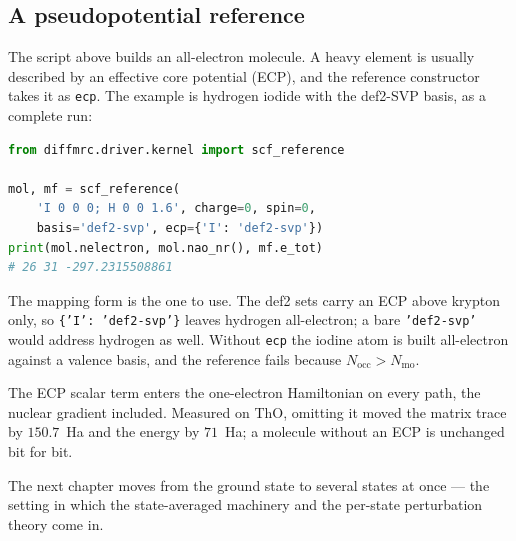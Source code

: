 \subsection{A pseudopotential reference}

The script above builds an all-electron molecule.  A heavy element is
usually described by an effective core potential (ECP), and the
reference constructor takes it as \texttt{ecp}.  The example is
hydrogen iodide with the def2-SVP basis, as a complete run:

\begin{lstlisting}[language=Python]
from diffmrc.driver.kernel import scf_reference

mol, mf = scf_reference(
    'I 0 0 0; H 0 0 1.6', charge=0, spin=0,
    basis='def2-svp', ecp={'I': 'def2-svp'})
print(mol.nelectron, mol.nao_nr(), mf.e_tot)
# 26 31 -297.2315508861
\end{lstlisting}

The mapping form is the one to use.  The def2 sets carry an ECP above
krypton only, so \texttt{\{'I': 'def2-svp'\}} leaves hydrogen
all-electron; a bare \texttt{'def2-svp'} would address hydrogen as
well.  Without \texttt{ecp} the iodine atom is built all-electron
against a valence basis, and the reference fails because
$N_{\mathrm{occ}} > N_{\mathrm{mo}}$.

The ECP scalar term enters the one-electron Hamiltonian on every path,
the nuclear gradient included.  Measured on ThO, omitting it moved the
matrix trace by $150.7$~Ha and the energy by $71$~Ha; a molecule
without an ECP is unchanged bit for bit.

The next chapter moves from the ground state to several states at once
--- the setting in which the state-averaged machinery and the
per-state perturbation theory come in.
